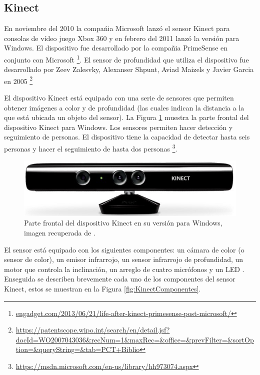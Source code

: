 \subsection{Kinect}

En noviembre del 2010 la compa\'nia Microsoft lanz\'o el sensor Kinect para consolas de vídeo juego Xbox 360 y en febrero del 2011 lanz\'o la versi\'on para Windows. El dispositivo fue desarrollado por la compa\~nia PrimeSense en conjunto con Microsoft \footnote{\url{engadget.com/2013/06/21/life-after-kinect-primesense-post-microsoft/}}. El sensor de profundidad que utiliza el dispositivo fue desarrollado por Zeev Zalesvky, Alexanser Shpunt, Aviad Maizels y Javier Garcia en 2005 \footnote{\url{https://patentscope.wipo.int/search/en/detail.jsf?docId=WO2007043036&recNum=1&maxRec=&office=&prevFilter=&sortOption=&queryString=&tab=PCT+Biblio}}   


El dispositivo Kinect está equipado con una serie de sensores que permiten obtener imágenes a color y de profundidad (las cuales indican la distancia a la que está ubicada un objeto del sensor). La Figura \ref{fig:KinectPic} muestra la parte frontal del dispositivo Kinect para Windows. Los sensores permiten hacer detección y seguimiento de personas. El dispositivo tiene la capacidad de detectar hasta seis personas y hacer el seguimiento de hasta dos personas \footnote{\url{https://msdn.microsoft.com/en-us/library/hh973074.aspx}}.    
  
\begin{figure}[h!]
\begin{center}
\includegraphics[scale=.65]{./Figures/Kinect.jpg}
\end{center}
\caption{Parte frontal del dispositivo Kinect en su versión para Windows, imagen recuperada de \protect\footnotemark{}.} 
\label{fig:KinectPic}
\end{figure} 


El sensor está equipado con los siguientes componentes: un cámara de color (o sensor de color), un emisor infrarrojo, un sensor infrarrojo de profundidad, un motor que controla la inclinación, un arreglo de cuatro micrófonos y un LED \citep{Jana2013}.
Enseguida se describen brevemente cada uno de los componentes del sensor Kinect, estos se muestran en la Figura \ref{fig:KinectComponentes}. 

